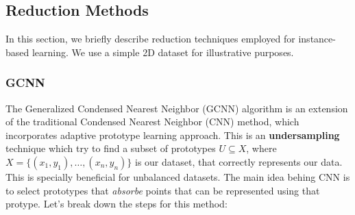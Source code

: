 
\subsection{Reduction Methods}
In this section, we briefly describe reduction techniques employed for instance-based learning. We use a simple 2D dataset for illustrative purposes.

\subsubsection{GCNN}

The Generalized Condensed Nearest Neighbor (GCNN) algorithm is an extension of the traditional Condensed Nearest Neighbor (CNN) method, which incorporates adaptive prototype learning approach. This is an \textbf{undersampling} technique which try to find a subset of prototypes $U \subseteq X$, where $X = \{(x_1,y_1), \ldots, (x_n,y_n)\}$ is our dataset, that correctly represents our data. This is specially beneficial for unbalanced datasets. The main idea behing CNN is to select prototypes that \textit{absorbe} points that can be represented using that protype. Let's break down the steps for this method:

